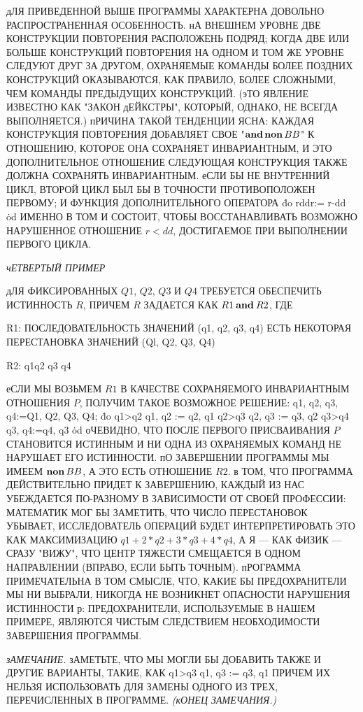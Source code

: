 дЛЯ ПРИВЕДЕННОЙ ВЫШЕ ПРОГРАММЫ ХАРАКТЕРНА ДОВОЛЬНО
РАСПРОСТРАНЕННАЯ ОСОБЕННОСТЬ. нА ВНЕШНЕМ УРОВНЕ ДВЕ КОНСТРУКЦИИ
ПОВТОРЕНИЯ РАСПОЛОЖЕНЬ ПОДРЯД; КОГДА ДВЕ ИЛИ
БОЛЬШЕ КОНСТРУКЦИЙ ПОВТОРЕНИЯ НА ОДНОМ И ТОМ ЖЕ УРОВНЕ
СЛЕДУЮТ ДРУГ ЗА ДРУГОМ, ОХРАНЯЕМЫЕ КОМАНДЫ БОЛЕЕ ПОЗДНИХ
КОНСТРУКЦИЙ ОКАЗЫВАЮТСЯ, КАК ПРАВИЛО, БОЛЕЕ СЛОЖНЫМИ, ЧЕМ
КОМАНДЫ ПРЕДЫДУЩИХ КОНСТРУКЦИЙ. (эТО ЯВЛЕНИЕ ИЗВЕСТНО КАК
"ЗАКОН дЕЙКСТРЫ", КОТОРЫЙ, ОДНАКО, НЕ ВСЕГДА ВЫПОЛНЯЕТСЯ.)
пРИЧИНА ТАКОЙ ТЕНДЕНЦИИ ЯСНА: КАЖДАЯ КОНСТРУКЦИЯ ПОВТОРЕНИЯ
ДОБАВЛЯЕТ СВОЕ "$\mathbin{\bf and} \mathop{\bf non}\nolimits BB$" К ОТНОШЕНИЮ, КОТОРОЕ ОНА
СОХРАНЯЕТ ИНВАРИАНТНЫМ, И ЭТО ДОПОЛНИТЕЛЬНОЕ ОТНОШЕНИЕ
СЛЕДУЮЩАЯ КОНСТРУКЦИЯ ТАКЖЕ ДОЛЖНА СОХРАНЯТЬ ИНВАРИАНТНЫМ.
еСЛИ БЫ НЕ ВНУТРЕННИЙ ЦИКЛ, ВТОРОЙ ЦИКЛ БЫЛ БЫ В ТОЧНОСТИ
ПРОТИВОПОЛОЖЕН ПЕРВОМУ; И ФУНКЦИЯ ДОПОЛНИТЕЛЬНОГО
ОПЕРАТОРА
\prg
\.{do} r\GE dd\TO r:= r-dd \.{od}
\grp
ИМЕННО В ТОМ И СОСТОИТ, ЧТОБЫ ВОССТАНАВЛИВАТЬ ВОЗМОЖНО НАРУШЕННОЕ
ОТНОШЕНИЕ $r<dd$, ДОСТИГАЕМОЕ ПРИ ВЫПОЛНЕНИИ ПЕРВОГО ЦИКЛА.

{\sl чЕТВЕРТЫЙ ПРИМЕР}

дЛЯ ФИКСИРОВАННЫХ $Q1$, $Q2$, $Q3$ И $Q4$ ТРЕБУЕТСЯ ОБЕСПЕЧИТЬ
ИСТИННОСТЬ $R$, ПРИЧЕМ $R$ ЗАДАЕТСЯ КАК $R1 \mathbin{\bf and} R2$, ГДЕ

R1: ПОСЛЕДОВАТЕЛЬНОСТЬ ЗНАЧЕНИЙ (q1, q2, q3, q4) ЕСТЬ НЕКОТОРАЯ
      ПЕРЕСТАНОВКА ЗНАЧЕНИЙ (Ql, Q2, Q3, Q4)

R2: q1\LE q2 \LE q3 \LE q4

еСЛИ МЫ ВОЗЬМЕМ $R1$ В КАЧЕСТВЕ СОХРАНЯЕМОГО ИНВАРИАНТНЫМ
ОТНОШЕНИЯ $P$, ПОЛУЧИМ ТАКОЕ ВОЗМОЖНОЕ РЕШЕНИЕ:
\prg
q1, q2, q3, q4:=Q1, Q2, Q3, Q4;
\.{do} q1>q2 \TO q1, q2 := q2, q1
\wbox q2>q3 \TO q2, q3 := q3, q2
\wbox q3>q4 \TO q3, q4:=q4, q3
\.{od}
\grp
оЧЕВИДНО, ЧТО ПОСЛЕ ПЕРВОГО ПРИСВАИВАНИЯ $P$ СТАНОВИТСЯ
ИСТИННЫМ И НИ ОДНА ИЗ ОХРАНЯЕМЫХ КОМАНД НЕ НАРУШАЕТ ЕГО
ИСТИННОСТИ. пО ЗАВЕРШЕНИИ ПРОГРАММЫ МЫ ИМЕЕМ $\mathop{\bf non}\nolimits BB$, А
ЭТО ЕСТЬ ОТНОШЕНИЕ $R2$. в ТОМ, ЧТО ПРОГРАММА ДЕЙСТВИТЕЛЬНО
ПРИДЕТ К ЗАВЕРШЕНИЮ, КАЖДЫЙ ИЗ НАС УБЕЖДАЕТСЯ ПО-РАЗНОМУ
В ЗАВИСИМОСТИ ОТ СВОЕЙ ПРОФЕССИИ: МАТЕМАТИК МОГ БЫ ЗАМЕТИТЬ,
ЧТО ЧИСЛО ПЕРЕСТАНОВОК УБЫВАЕТ, ИССЛЕДОВАТЕЛЬ ОПЕРАЦИЙ
БУДЕТ ИНТЕРПРЕТИРОВАТЬ ЭТО КАК МАКСИМИЗАЦИЮ $q1+2*q2+3*q3+4*q4$,
А Я --- КАК ФИЗИК --- СРАЗУ "ВИЖУ", ЧТО ЦЕНТР
ТЯЖЕСТИ СМЕЩАЕТСЯ В ОДНОМ НАПРАВЛЕНИИ (ВПРАВО, ЕСЛИ БЫТЬ
ТОЧНЫМ). пРОГРАММА ПРИМЕЧАТЕЛЬНА В ТОМ СМЫСЛЕ, ЧТО, КАКИЕ
БЫ ПРЕДОХРАНИТЕЛИ МЫ НИ ВЫБРАЛИ, НИКОГДА НЕ ВОЗНИКНЕТ
ОПАСНОСТИ НАРУШЕНИЯ ИСТИННОСТИ р: ПРЕДОХРАНИТЕЛИ,
ИСПОЛЬЗУЕМЫЕ В НАШЕМ ПРИМЕРЕ, ЯВЛЯЮТСЯ ЧИСТЫМ СЛЕДСТВИЕМ
НЕОБХОДИМОСТИ ЗАВЕРШЕНИЯ ПРОГРАММЫ.

{\sl зАМЕЧАНИЕ.} зАМЕТЬТЕ, ЧТО МЫ МОГЛИ БЫ ДОБАВИТЬ ТАКЖЕ И
ДРУГИЕ ВАРИАНТЫ, ТАКИЕ, КАК
\prg
q1>q3 \to q1, q3 := q3, q1
\grp
ПРИЧЕМ ИХ НЕЛЬЗЯ ИСПОЛЬЗОВАТЬ ДЛЯ ЗАМЕНЫ ОДНОГО ИЗ ТРЕХ,
ПЕРЕЧИСЛЕННЫХ В ПРОГРАММЕ. {\sl (кОНЕЦ ЗАМЕЧАНИЯ.)}

